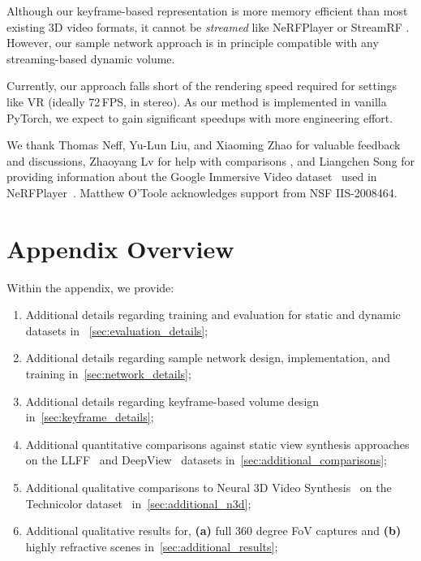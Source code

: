 \documentclass[10pt,twocolumn,letterpaper]{article}
\makeatletter
\renewcommand\paragraph{\@startsection{paragraph}{4}{\z@}{0.75ex \@plus.5ex \@minus.2ex}{-1em}{\normalfont\normalsize\bfseries\maybe@addperiod}}
\newcommand{\maybe@addperiod}[1]{#1\@addpunct{.}}
\makeatother
\begin{document}
Although our keyframe-based representation is more memory efficient than most existing 3D video formats, it cannot be \textit{streamed} like NeRFPlayer \cite{SongCLCCYXG2023} or StreamRF \cite{LiSWST2022}.
However, our sample network approach is in principle compatible with any streaming-based dynamic volume.

Currently, our approach falls short of the rendering speed required for settings like VR (ideally 72\,FPS, in stereo).
As our method is implemented in vanilla PyTorch, we expect to gain significant speedups with more engineering effort.







\paragraph{Acknowledgments}

We thank Thomas Neff, Yu-Lun Liu, and Xiaoming Zhao for valuable feedback and discussions, Zhaoyang Lv for help
with comparisons
\cite{LiSZGLKSLGL2022}, and Liangchen Song for providing information about the Google Immersive Video dataset~\cite{BroxtFOEHDDBWD2020} used in NeRFPlayer~\cite{SongCLCCYXG2023}.
Matthew O'Toole acknowledges support from NSF IIS-2008464. 
{\small


}

\appendix
{}








\section{Appendix Overview}
\noindent
Within the appendix, we provide:

\begin{enumerate}
    \item Additional details regarding training and evaluation for static and dynamic datasets in ~\cref{sec:evaluation_details};
    \item Additional details regarding sample network design, implementation, and training in~\cref{sec:network_details};
    \item Additional details regarding keyframe-based volume design in~\cref{sec:keyframe_details};
    \item Additional quantitative comparisons against static view synthesis approaches on the LLFF~\cite{MildeSTBRN2020} and DeepView~\cite{FlynnBDDFOST2019} datasets in~\cref{sec:additional_comparisons};
    \item Additional qualitative comparisons to Neural 3D Video Synthesis~\cite{LiSZGLKSLGL2022} on the Technicolor dataset~\cite{sabater2017dataset} in~\cref{sec:additional_n3d};
    \item Additional qualitative results for, \textbf{(a)} full 360 degree FoV captures and \textbf{(b)} highly refractive scenes in~\cref{sec:additional_results};
\end{enumerate}
\end{document}

